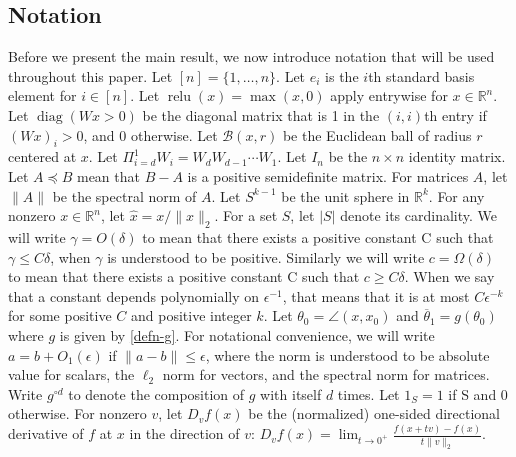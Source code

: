 \documentclass[11pt]{article}
\newcommand{\R}{\mathbb{R}}
\newcommand{\calB}{\mathcal{B}}
\newcommand{\eps}{\epsilon}
\newcommand{\thetabar}{\overline{\theta}}
\newcommand{\spherek}{S^{k-1}}
\newcommand{\red}[1]{{\color{black} #1}}
\newcommand{\xo}{x_0}
\newcommand{\Aplus}[1]{A_{+, #1}}
\newcommand{\Apx}{\Aplus{x}}
\newcommand{\matrixleq}{\preceq}
\newcommand{\Mxyhat}{M_{\hat{x} \leftrightarrow \hat{y}}}
\newcommand{\xhat}{\hat{x}}
\newcommand{\yhat}{\hat{y}}
\newcommand{\Bpx}{B_{+, x}}
\newcommand{\Wnpx}[1]{W_{#1, +, x}}
\newcommand{\Wipx}{W_{i, +, x}}
\newcommand{\Win}[1]{W_{#1}}
\newcommand{\Wi}{\Win{i}}
\DeclareMathOperator{\Span}{span}
\DeclareMathOperator{\relu}{relu}
\DeclareMathOperator{\diag}{diag}
\begin{document}
\red{\subsection{Notation}  \label{sec:notation}
Before we present the main result, we now introduce notation that will be used throughout this paper. Let $[n] = \{1, \ldots, n\}$. Let $e_i$ is the $i$th standard basis element
for $i \in [n]$.  Let $\relu(x) = \max(x, 0)$ apply entrywise for $x \in \R^n$.  Let $\diag(Wx>0)$ be the diagonal matrix that is 1 in the $(i,i)$th entry if $(Wx)_i > 0$, and 0 otherwise.  Let $\calB(x, r)$ be the Euclidean ball of radius $r$ centered at $x$.  Let $\Pi_{i=d}^1 W_i = W_d W_{d-1} \cdots W_1$.  
   Let $I_n$ be the $n \times n$ identity matrix.  Let $A \matrixleq B$ mean that $B-A$ is a positive semidefinite matrix.  For matrices $A$, let $\|A\|$ be the spectral norm of $A$.  Let $\spherek$ be the unit sphere in $\R^k$. 
  For any nonzero $x \in \R^n$, let $\hat{x} = x / \|x\|_2$.  %
  For a set $S$, let $|S|$ denote its cardinality. 
We will write $\gamma = O( \delta)$ to mean that there exists a positive constant C such that $\gamma \leq C \delta$, when $\gamma$ is understood to be positive.  Similarly we will write $c = \Omega( \delta)$ to mean that there exists a positive constant C such that $c \geq C \delta$.   
When we say that a constant depends polynomially on $\eps^{-1}$, that means that it is at most $C \eps^{-k}$ for some positive $C$ and positive integer $k$.  %
Let $\theta_0 = \angle (x, \xo)$ and $\thetabar_1  = g(\theta_0)$ where $g$ is given by \eqref{defn-g}.
For notational convenience, we will write $a = b + O_1(\eps)$ if $\| a-b\| \leq \eps$, where the norm is understood to be absolute value for scalars, the $\ell_2$ norm for vectors, and the spectral norm for matrices.  Write $g^{\circ d}$ to denote the composition of $g$ with itself $d$ times.
Let $1_S = 1$ if S and 0 otherwise.  For nonzero $v$, let $D_v f(x)$ be the (normalized) one-sided directional derivative of $f$ at $x$ in the direction of $v$: $D_v f(x) = \lim_{t \to 0^+} \frac{f(x + t v) - f(x)}{t \|v\|_2}$.}
\end{document}
